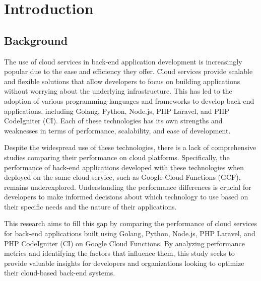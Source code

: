 \documentclass[final,3p,times,twocolumn]{elsarticle}
\begin{document}

\section{Introduction}\label{sec1}
\subsection{Background}
The use of cloud services in back-end application development is increasingly popular due to the ease and efficiency they offer. Cloud services provide scalable and flexible solutions that allow developers to focus on building applications without worrying about the underlying infrastructure. This has led to the adoption of various programming languages and frameworks to develop back-end applications, including Golang, Python, Node.js, PHP Laravel, and PHP CodeIgniter (CI). Each of these technologies has its own strengths and weaknesses in terms of performance, scalability, and ease of development.

Despite the widespread use of these technologies, there is a lack of comprehensive studies comparing their performance on cloud platforms. Specifically, the performance of back-end applications developed with these technologies when deployed on the same cloud service, such as Google Cloud Functions (GCF), remains underexplored. Understanding the performance differences is crucial for developers to make informed decisions about which technology to use based on their specific needs and the nature of their applications.

This research aims to fill this gap by comparing the performance of cloud services for back-end applications built using Golang, Python, Node.js, PHP Laravel, and PHP CodeIgniter (CI) on Google Cloud Functions. By analyzing performance metrics and identifying the factors that influence them, this study seeks to provide valuable insights for developers and organizations looking to optimize their cloud-based back-end systems.


\end{document}
